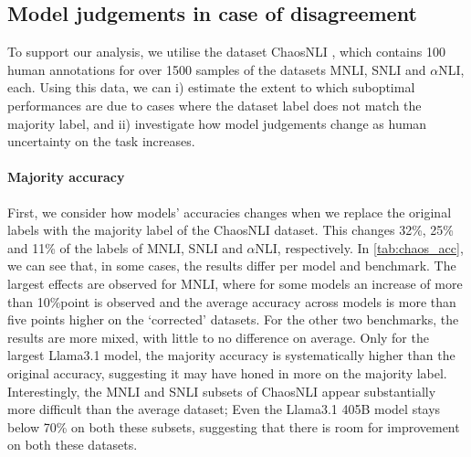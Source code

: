 \subsection{Model judgements in case of disagreement}\label{subsec:chaosnli}

% 
% 

To support our analysis, we utilise the dataset ChaosNLI \citep{nie-etal-2020-learn}, which contains 100 human annotations for over 1500 samples of the datasets MNLI, SNLI and $\alpha$NLI, each.
Using this data, we can i) estimate the extent to which suboptimal performances are due to cases where the dataset label does not match the majority label, and ii) investigate how model judgements change as human uncertainty on the task increases.

\paragraph{Majority accuracy}
First, we consider how models' accuracies changes when we replace the original labels with the majority label of the ChaosNLI dataset.
This changes 32\%, 25\% and 11\% of the labels of MNLI, SNLI and $\alpha$NLI, respectively.
In \cref{tab:chaos_acc}, we can see that, in some cases, the results differ per model and benchmark.
The largest effects are observed for MNLI, where for some models an increase of more than 10\%point is observed and the average accuracy across models is more than five points higher on the `corrected' datasets.
For the other two benchmarks, the results are more mixed, with little to no difference on average.
Only for the largest Llama3.1 model, the majority accuracy is systematically higher than the original accuracy, suggesting it may have honed in more on the majority label.
Interestingly, the MNLI and SNLI subsets of ChaosNLI appear substantially more difficult than the average dataset;
Even the Llama3.1 405B model stays below 70\% on both these subsets, suggesting that there is room for improvement on both these datasets.

